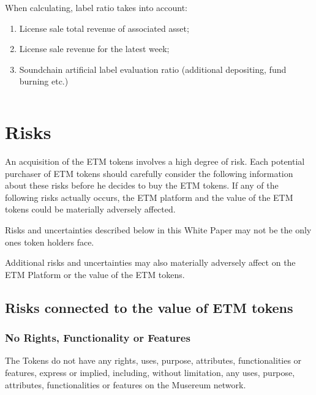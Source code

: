 \documentclass[12pt]{report}
\begin{document}
When calculating, label ratio takes into account:
\begin{enumerate}
	\item License sale total revenue of associated asset;
	\item License sale revenue for the latest week;
	\item Soundchain artificial label evaluation ratio (additional depositing, fund burning etc.)
\end{enumerate}
\begin{equation}
\end{equation}



\chapter{Risks}
\label{risks}

An acquisition of the ETM tokens involves a high degree of risk. Each potential purchaser of ETM tokens should carefully consider the following information about these risks before he decides to buy the ETM tokens. If any of the following risks actually occurs, the ETM platform and the value of the ETM tokens could be materially adversely affected.

Risks and uncertainties described below in this White Paper may not be the only ones token holders face.

Additional risks and uncertainties may also materially adversely affect on the ETM Platform or the value of the ETM tokens.

\section{Risks connected to the value of ETM tokens}
\label{risks-value}
\subsection{No Rights, Functionality or Features}
\label{risks-value-rights}
The Tokens do not have any rights, uses, purpose, attributes, functionalities or features, express or implied, including, without limitation, any uses, purpose, attributes, functionalities or features on the Musereum network.
\end{document}
